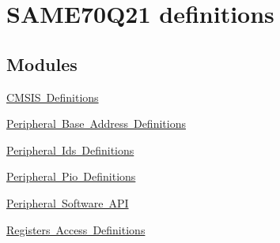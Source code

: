 \hypertarget{group__SAME70Q21__definitions}{}\section{S\+A\+M\+E70\+Q21 definitions}
\label{group__SAME70Q21__definitions}
\subsection*{Modules}
\begin{DoxyCompactItemize}
\item 
\mbox{\hyperlink{group__SAME70Q21__cmsis}{C\+M\+S\+I\+S Definitions}}
\item 
\mbox{\hyperlink{group__SAME70Q21__base}{Peripheral Base Address Definitions}}
\item 
\mbox{\hyperlink{group__SAME70Q21__id}{Peripheral Ids Definitions}}
\item 
\mbox{\hyperlink{group__SAME70Q21__pio}{Peripheral Pio Definitions}}
\item 
\mbox{\hyperlink{group__SAME70Q21__api}{Peripheral Software A\+PI}}
\item 
\mbox{\hyperlink{group__SAME70Q21__reg}{Registers Access Definitions}}
\end{DoxyCompactItemize}
